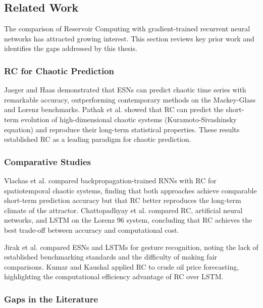 \subsection{Related Work}
\label{sec:related}

The comparison of Reservoir Computing with gradient-trained recurrent neural networks has attracted growing interest. This section reviews key prior work and identifies the gaps addressed by this thesis.

\subsubsection{RC for Chaotic Prediction}

Jaeger and Haas \cite{jaeger2004harnessing} demonstrated that ESNs can predict chaotic time series with remarkable accuracy, outperforming contemporary methods on the Mackey-Glass and Lorenz benchmarks. Pathak et al. \cite{pathak2018model} showed that RC can predict the short-term evolution of high-dimensional chaotic systems (Kuramoto-Sivashinsky equation) and reproduce their long-term statistical properties. These results established RC as a leading paradigm for chaotic prediction.

\subsubsection{Comparative Studies}

Vlachas et al. \cite{vlachas2020backpropagation} compared backpropagation-trained RNNs with RC for spatiotemporal chaotic systems, finding that both approaches achieve comparable short-term prediction accuracy but that RC better reproduces the long-term climate of the attractor. Chattopadhyay et al. \cite{chattopadhyay2020data} compared RC, artificial neural networks, and LSTM on the Lorenz 96 system, concluding that RC achieves the best trade-off between accuracy and computational cost.

Jirak et al. \cite{jirak2023echo} compared ESNs and LSTMs for gesture recognition, noting the lack of established benchmarking standards and the difficulty of making fair comparisons. Kumar and Kaushal \cite{kumar2025forecasting} applied RC to crude oil price forecasting, highlighting the computational efficiency advantage of RC over LSTM.

\subsubsection{Gaps in the Literature}

